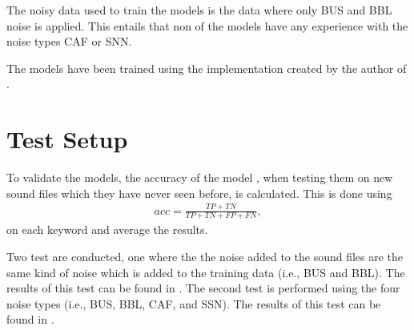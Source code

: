 The noisy data used to train the models is the data where only BUS and BBL noise is applied. This entails that non of the models have any experience with the noise types CAF or SNN.

The models have been trained using the implementation created by the author of \cite{bovbjerg2023improving}. 

\section{Test Setup}
To validate the models, the accuracy of the model , when testing them on new sound files which they have never seen before, is calculated. This is done using 
\begin{align} \label{eq:acc}
    acc = \frac{TP + TN}{TP + TN + FP + FN},
\end{align}
on each keyword and average the results.

Two test are conducted, one where the the noise added to the sound files are the same kind of noise which is added to the training data (i.e., BUS and BBL). The results of this test can be found in . The second test is performed using the four noise types (i.e., BUS, BBL, CAF, and SSN). The results of this test can be found in .

